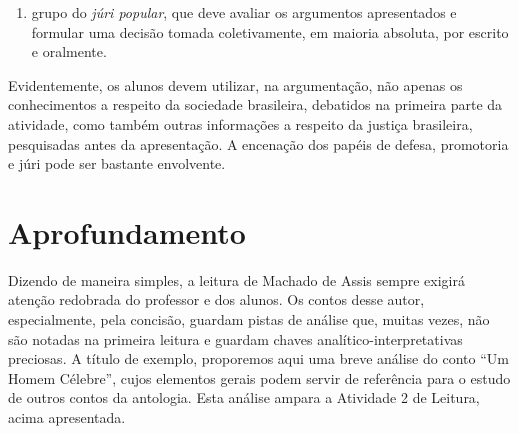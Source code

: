 \documentclass[12pt]{extarticle}
\begin{document}
\begin{enumerate}
\begin{enumerate}
\item grupo do \emph{júri popular}, que deve avaliar os argumentos
apresentados e formular uma decisão tomada coletivamente, em maioria
absoluta, por escrito e oralmente.
\end{enumerate}

Evidentemente, os alunos devem utilizar, na argumentação, não apenas os
conhecimentos a respeito da sociedade brasileira, debatidos na primeira
parte da atividade, como também outras informações a respeito da justiça
brasileira, pesquisadas antes da apresentação. A encenação dos papéis de
defesa, promotoria e júri pode ser bastante envolvente.
\end{enumerate}

\section{Aprofundamento}

Dizendo de maneira simples, a leitura de Machado de Assis sempre exigirá
atenção redobrada do professor e dos alunos. Os contos desse autor,
especialmente, pela concisão, guardam pistas de análise que, muitas
vezes, não são notadas na primeira leitura e guardam chaves
analítico-interpretativas preciosas. A título de exemplo, proporemos
aqui uma breve análise do conto ``Um Homem Célebre'', cujos elementos
gerais podem servir de referência para o estudo de outros contos da
antologia. Esta análise ampara a Atividade 2 de Leitura, acima
apresentada.
\end{document}
